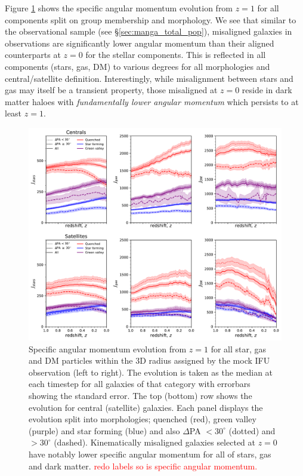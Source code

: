\documentclass[fleqn,usenatbib]{mnras}
\newcommand{\red}[1]{{\textcolor{red}{#1}}}
\begin{document}
Figure \ref{fig:sJ_evo} shows the specific angular momentum evolution from $z=1$ for all components split on group membership and morphology. We see that similar to the observational sample (see \S\ref{sec:manga_total_pop}), misaligned galaxies in observations are significantly lower angular momentum than their aligned counterparts at $z=0$ for the stellar components. This is reflected in all components (stars, gas, DM) to various degrees for all morphologies and central/satellite definition. Interestingly, while misalignment between stars and gas may itself be a transient property, those misaligned at $z = 0$ reside in dark matter haloes with \textit{fundamentally lower angular momentum} which persists to at least $z = 1$. 

\begin{figure}
	\includegraphics[width=\linewidth]{tng_results/sJ_evo_cen_sat.pdf}
    \caption{Specific angular momentum evolution from $z = 1$ for all star, gas and DM particles within the 3D radius assigned by the mock IFU observation (left to right). The evolution is taken as the median at each timestep for all galaxies of that category with errorbars showing the standard error. The top (bottom) row shows the evolution for central (satellite) galaxies. Each panel displays the evolution split into morphologies; quenched (red), green valley (purple) and star forming (blue) and also $\Delta$PA $< 30^{\circ}$ (dotted) and $> 30^{\circ}$ (dashed). Kinematically misaligned galaxies selected at $z=0$ have notably lower specific angular momentum for all of stars, gas and dark matter. \red{redo labels so is specific angular momentum.}}
    \label{fig:sJ_evo}
\end{figure}
\end{document}
